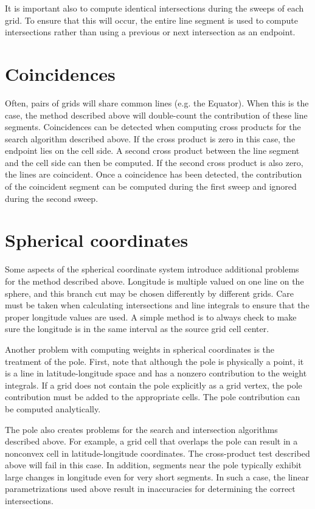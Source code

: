 \begin{description}
     It is important also to compute identical intersections during the sweeps
     of each grid.  To ensure that this will occur, the entire line segment is
     used to compute intersections rather than using a previous or next
     intersection as an endpoint.

\section{Coincidences}

     Often, pairs of grids will share common lines (e.g. the Equator).  When
     this is the case, the method described above will double-count the
     contribution of these line segments.  Coincidences can be detected when
     computing cross products for the search algorithm described above.  If
     the cross product is zero in this case, the endpoint lies on the cell
     side.  A second cross product between the line segment and the cell side
     can then be computed.  If the second cross product is also zero, the
     lines are coincident.  Once a coincidence has been detected, the
     contribution of the coincident segment can be computed during the
     first sweep and ignored during the second sweep.

\section{Spherical coordinates}\label{sec-sphere}

     Some aspects of the spherical coordinate system introduce additional
     problems for the method described above.  Longitude is multiple valued
     on one line on the sphere, and this branch cut may be chosen differently
     by different grids.  Care must be taken when calculating intersections 
     and line integrals to ensure that the proper longitude values are used.
     A simple method is to always check to make sure the longitude is in the
     same interval as the source grid cell center.

     Another problem with computing weights in spherical coordinates is the
     treatment of the pole.  First, note that although the pole is physically
     a point, it is a line in latitude-longitude space and has a nonzero
     contribution to the weight integrals.  If a grid does not contain the
     pole explicitly as a grid vertex, the pole contribution must be added
     to the appropriate cells.  The pole contribution can be computed analytically.

     The pole also creates problems for the search and intersection algorithms
     described above.  For example, a grid cell that overlaps the pole can
     result in a nonconvex cell in latitude-longitude coordinates.  The
     cross-product test described above will fail in this case.  In addition,
     segments near the pole typically exhibit large changes in longitude even
     for very short segments.  In such a case, the linear parametrizations used
     above result in inaccuracies for determining the correct intersections.


\end{description}
